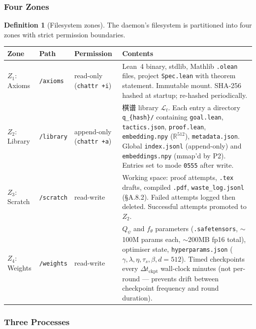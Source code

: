 \documentclass[11pt,a4paper]{article}
\theoremstyle{definition}
\newtheorem{definition}[theorem]{Definition}
\theoremstyle{remark}
\begin{document}
\subsubsection*{Four Zones}

\begin{definition}[Filesystem zones]\label{def:zones}
The daemon's filesystem is partitioned into four zones with strict permission boundaries.

\begin{center}
\small
\begin{tabularx}{\textwidth}{l l l X}
\toprule
\textbf{Zone} & \textbf{Path} & \textbf{Permission} & \textbf{Contents} \\
\midrule
$Z_1$: Axioms & \texttt{/axioms} & read-only (\texttt{chattr +i}) & Lean~4 binary, stdlib, Mathlib \texttt{.olean} files, project \texttt{Spec.lean} with theorem statement. Immutable mount. SHA-256 hashed at startup; re-hashed periodically. \\
$Z_2$: Library & \texttt{/library} & append-only (\texttt{chattr +a}) & 棋谱 library $\mathcal{L}_t$. Each entry a directory \texttt{q\_\{hash\}/} containing \texttt{goal.lean}, \texttt{tactics.json}, \texttt{proof.lean}, \texttt{embedding.npy} ($\mathbb{R}^{512}$), \texttt{metadata.json}. Global \texttt{index.jsonl} (append-only) and \texttt{embeddings.npy} (mmap'd by P2). Entries set to mode \texttt{0555} after write. \\
$Z_3$: Scratch & \texttt{/scratch} & read-write & Working space: proof attempts, \texttt{.tex} drafts, compiled \texttt{.pdf}, \texttt{waste\_log.jsonl} (\S A.8.2). Failed attempts logged then deleted. Successful attempts promoted to $Z_2$. \\
$Z_4$: Weights & \texttt{/weights} & read-write & $Q_\psi$ and $f_\theta$ parameters (\texttt{.safetensors}, $\sim$100M params each, $\sim$200MB fp16 total), optimiser state, \texttt{hyperparams.json} ($\gamma, \lambda, \eta, \tau_s, \beta, d{=}512$). Timed checkpoints every $\Delta t_{\mathrm{ckpt}}$ wall-clock minutes (not per-round --- prevents drift between checkpoint frequency and round duration). \\
\bottomrule
\end{tabularx}
\end{center}
\end{definition}


\subsubsection*{Three Processes}
\end{document}
